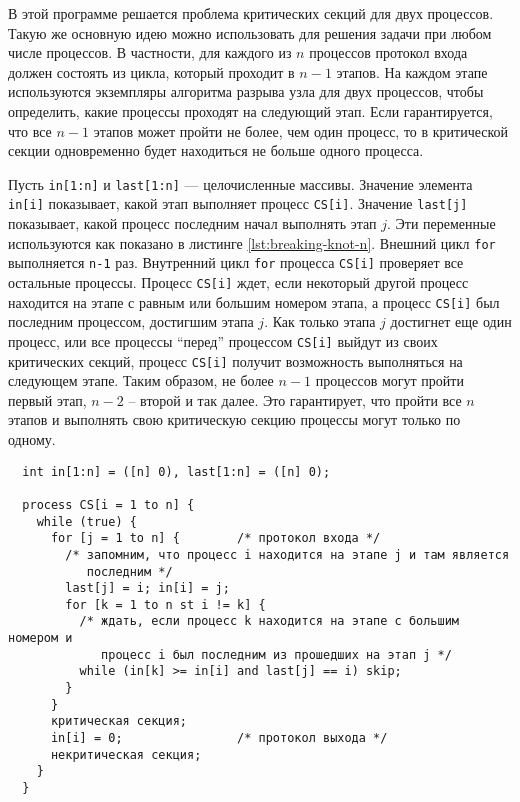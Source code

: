 В этой программе решается проблема критических секций для двух процессов. Такую
же основную идею можно использовать для решения задачи при любом числе
процессов. В частности, для каждого из $n$ процессов протокол входа должен
состоять из цикла, который проходит в $n-1$ этапов. На каждом этапе используются
экземпляры алгоритма разрыва узла для двух процессов, чтобы определить, какие
процессы проходят на следующий этап. Если гарантируется, что все $n-1$ этапов
может пройти не более, чем один процесс, то в критической секции одновременно
будет находиться не больше одного процесса.

Пусть \texttt{in[1:n]} и \texttt{last[1:n]} --- целочисленные массивы. Значение
элемента \texttt{in[i]} показывает, какой этап выполняет процесс \texttt{CS[i]}.
Значение \texttt{last[j]} показывает, какой процесс последним начал выполнять
этап $j$. Эти переменные используются как показано в листинге
\ref{lst:breaking-knot-n}. Внешний цикл \texttt{for} выполняется \texttt{n-1}
раз. Внутренний цикл \texttt{for} процесса \texttt{CS[i]} проверяет все
остальные процессы. Процесс \texttt{CS[i]} ждет, если некоторый другой процесс
находится на этапе с равным или большим номером этапа, а процесс \texttt{CS[i]}
был последним процессом, достигшим этапа $j$. Как только этапа $j$ достигнет еще
один процесс, или все процессы ``перед'' процессом \texttt{CS[i]} выйдут из
своих критических секций, процесс \texttt{CS[i]} получит возможность выполняться
на следующем этапе. Таким образом, не более $n-1$ процессов могут пройти первый
этап, $n-2$ -- второй и так далее. Это гарантирует, что пройти все $n$ этапов и
выполнять свою критическую секцию процессы могут только по одному.

\lstset{label=lst:breaking-knot-n,
  caption=Алгоритм разрыва узла для $n$ процессов}
\begin{lstlisting}
  int in[1:n] = ([n] 0), last[1:n] = ([n] 0);

  process CS[i = 1 to n] {
    while (true) {
      for [j = 1 to n] {        /* протокол входа */
        /* запомним, что процесс i находится на этапе j и там является
           последним */
        last[j] = i; in[i] = j;
        for [k = 1 to n st i != k] {
          /* ждать, если процесс k находится на этапе с большим номером и
             процесс i был последним из прошедших на этап j */
          while (in[k] >= in[i] and last[j] == i) skip;
        }
      }
      критическая секция;
      in[i] = 0;                /* протокол выхода */
      некритическая секция;
    }
  }
\end{lstlisting}

